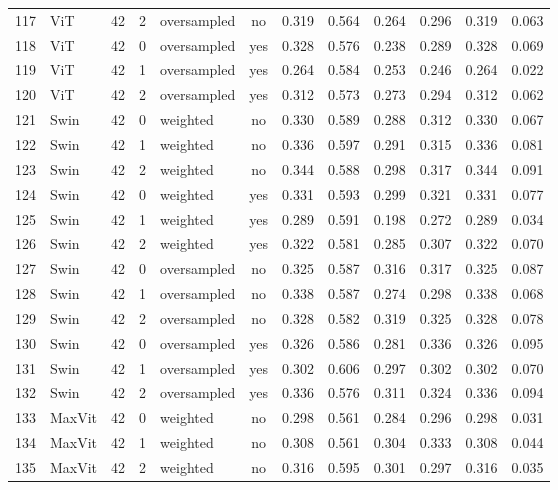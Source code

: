 \documentclass[a4paper,10pt]{book}
\begin{document}
\begin{scriptsize}
\begin{longtable}{@{}l l c c l c c c c c c c@{}}
        117 & ViT & 42 & 2 & oversampled & no & 0.319 & 0.564 & 0.264 & 0.296 & 0.319 & 0.063 \\ 
        118 & ViT & 42 & 0 & oversampled & yes & 0.328 & 0.576 & 0.238 & 0.289 & 0.328 & 0.069 \\ 
        119 & ViT & 42 & 1 & oversampled & yes & 0.264 & 0.584 & 0.253 & 0.246 & 0.264 & 0.022 \\ 
        120 & ViT & 42 & 2 & oversampled & yes & 0.312 & 0.573 & 0.273 & 0.294 & 0.312 & 0.062 \\ 
        121 & Swin & 42 & 0 & weighted & no & 0.330 & 0.589 & 0.288 & 0.312 & 0.330 & 0.067 \\ 
        122 & Swin & 42 & 1 & weighted & no & 0.336 & 0.597 & 0.291 & 0.315 & 0.336 & 0.081 \\ 
        123 & Swin & 42 & 2 & weighted & no & 0.344 & 0.588 & 0.298 & 0.317 & 0.344 & 0.091 \\ 
        124 & Swin & 42 & 0 & weighted & yes & 0.331 & 0.593 & 0.299 & 0.321 & 0.331 & 0.077 \\ 
        125 & Swin & 42 & 1 & weighted & yes & 0.289 & 0.591 & 0.198 & 0.272 & 0.289 & 0.034 \\ 
        126 & Swin & 42 & 2 & weighted & yes & 0.322 & 0.581 & 0.285 & 0.307 & 0.322 & 0.070 \\ 
        127 & Swin & 42 & 0 & oversampled & no & 0.325 & 0.587 & 0.316 & 0.317 & 0.325 & 0.087 \\ 
        128 & Swin & 42 & 1 & oversampled & no & 0.338 & 0.587 & 0.274 & 0.298 & 0.338 & 0.068 \\ 
        129 & Swin & 42 & 2 & oversampled & no & 0.328 & 0.582 & 0.319 & 0.325 & 0.328 & 0.078 \\ 
        130 & Swin & 42 & 0 & oversampled & yes & 0.326 & 0.586 & 0.281 & 0.336 & 0.326 & 0.095 \\ 
        131 & Swin & 42 & 1 & oversampled & yes & 0.302 & 0.606 & 0.297 & 0.302 & 0.302 & 0.070 \\ 
        132 & Swin & 42 & 2 & oversampled & yes & 0.336 & 0.576 & 0.311 & 0.324 & 0.336 & 0.094 \\ 
        133 & MaxVit & 42 & 0 & weighted & no & 0.298 & 0.561 & 0.284 & 0.296 & 0.298 & 0.031 \\ 
        134 & MaxVit & 42 & 1 & weighted & no & 0.308 & 0.561 & 0.304 & 0.333 & 0.308 & 0.044 \\ 
        135 & MaxVit & 42 & 2 & weighted & no & 0.316 & 0.595 & 0.301 & 0.297 & 0.316 & 0.035 \\ 

\end{longtable}
\end{scriptsize}
\end{document}
